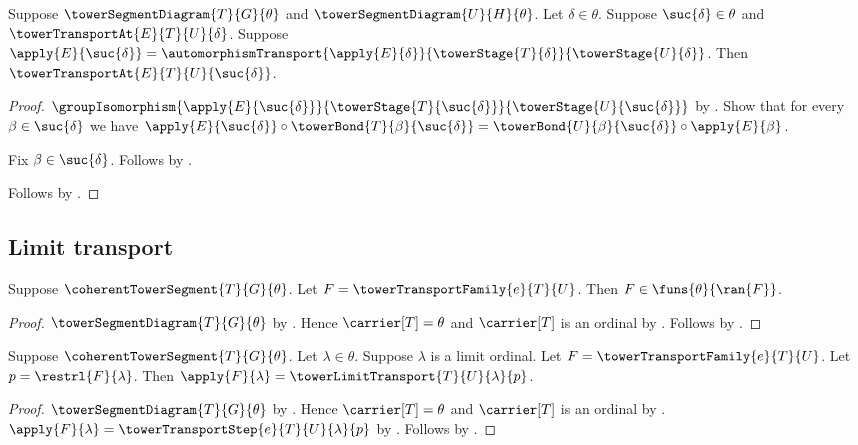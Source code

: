 \begin{proposition}\label{tower_transport_at_successor}
    Suppose $\towerSegmentDiagram{T}{G}{\theta}$ and
        $\towerSegmentDiagram{U}{H}{\theta}$.
    Let $\delta\in\theta$.
    Suppose $\suc{\delta}\in\theta$ and
        $\towerTransportAt{E}{T}{U}{\delta}$.
    Suppose $\apply{E}{\suc{\delta}}=
        \automorphismTransport{\apply{E}{\delta}}
            {\towerStage{T}{\delta}}{\towerStage{U}{\delta}}$.
    Then $\towerTransportAt{E}{T}{U}{\suc{\delta}}$.
\end{proposition}
\begin{proof}
    $\groupIsomorphism{\apply{E}{\suc{\delta}}}
        {\towerStage{T}{\suc{\delta}}}
        {\towerStage{U}{\suc{\delta}}}$ by
        .
    Show that for every $\beta\in\suc{\delta}$ we have
        $\apply{E}{\suc{\delta}}\circ
            \towerBond{T}{\beta}{\suc{\delta}}=
        \towerBond{U}{\beta}{\suc{\delta}}\circ
            \apply{E}{\beta}$.
    \begin{subproof}
        Fix $\beta\in\suc{\delta}$.
        Follows by .
    \end{subproof}
    Follows by .
\end{proof}

\subsection{Limit transport}

\begin{proposition}\label{tower_transport_family_type_under_segment}
    Suppose $\coherentTowerSegment{T}{G}{\theta}$.
    Let $F=\towerTransportFamily{e}{T}{U}$.
    Then $F\in\funs{\theta}{\ran{F}}$.
\end{proposition}
\begin{proof}
    $\towerSegmentDiagram{T}{G}{\theta}$ by
        .
    Hence $\carrier[T]=\theta$ and $\carrier[T]$ is an ordinal by
        .
    Follows by .
\end{proof}

\begin{proposition}\label{tower_transport_family_limit_equation}
    Suppose $\coherentTowerSegment{T}{G}{\theta}$.
    Let $\lambda\in\theta$.
    Suppose $\lambda$ is a limit ordinal.
    Let $F=\towerTransportFamily{e}{T}{U}$.
    Let $p=\restrl{F}{\lambda}$.
    Then $\apply{F}{\lambda}=\towerLimitTransport{T}{U}{\lambda}{p}$.
\end{proposition}
\begin{proof}
    $\towerSegmentDiagram{T}{G}{\theta}$ by
        .
    Hence $\carrier[T]=\theta$ and $\carrier[T]$ is an ordinal by
        .
    $\apply{F}{\lambda}=
        \towerTransportStep{e}{T}{U}{\lambda}{p}$ by
        .
    Follows by .
\end{proof}

